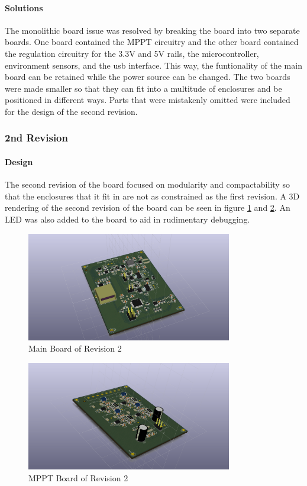 \documentclass{article}
\numberwithin{figure}{section}
\numberwithin{equation}{section}
\begin{document}
{\paragraph{Solutions}
The monolithic board issue was resolved by breaking the board into two separate boards. One board contained the MPPT circuitry and the other board contained the regulation circuitry for the 3.3V and 5V rails, the microcontroller, environment sensors, and the usb interface. This way, the funtionality of the main board can be retained while the power source can be changed. The two boards were made smaller so that they can fit into a multitude of enclosures and be positioned in different ways. Parts that were mistakenly omitted were included for the design of the second revision. 
\subsubsection{2nd Revision}\label{conclusion-pcb-rev2}
\paragraph{Design}
The second revision of the board focused on modularity and compactability so that the enclosures that it fit in are not as constrained as the first revision. A 3D rendering of the second revision of the board can be seen in figure \ref{fig:b21} and \ref{fig:b22}. An LED was also added to the board to aid in rudimentary debugging. 

\begin{figure}[H]
	\centering
	\includegraphics[width=0.8\textwidth]{Mainboard_top}
	\caption{Main Board of Revision 2}
	\label{fig:b21}
\end{figure}

\begin{figure}[H]
	\centering
	\includegraphics[width=0.8\textwidth]{MPPTboard_top}
	\caption{MPPT Board of Revision 2}
	\label{fig:b22}
\end{figure}

}
\end{document}
